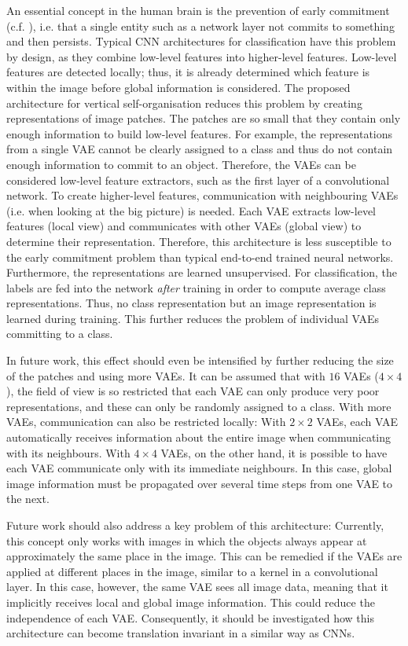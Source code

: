 An essential concept in the human brain is the prevention of early commitment (c.f. ), i.e. that a single entity such as a network layer not commits to something and then persists. Typical CNN architectures for classification have this problem by design, as they combine low-level features into higher-level features. Low-level features are detected locally; thus, it is already determined which feature is within the image before global information is considered. The proposed architecture for vertical self-organisation reduces this problem by creating representations of image patches. The patches are so small that they contain only enough information to build low-level features. For example, the representations from a single VAE cannot be clearly assigned to a class and thus do not contain enough information to commit to an object. Therefore, the VAEs can be considered low-level feature extractors, such as the first layer of a convolutional network. To create higher-level features, communication with neighbouring VAEs (i.e. when looking at the big picture) is needed. Each VAE extracts low-level features (local view) and communicates with other VAEs (global view) to determine their representation. Therefore, this architecture is less susceptible to the early commitment problem than typical end-to-end trained neural networks.
Furthermore, the representations are learned unsupervised. For classification, the labels are fed into the network \emph{after} training in order to compute average class representations. Thus, no class representation but an image representation is learned during training. This further reduces the problem of individual VAEs committing to a class.

In future work, this effect should even be intensified by further reducing the size of the patches and using more VAEs. It can be assumed that with $16$ VAEs ($4\times4$), the field of view is so restricted that each VAE can only produce very poor representations, and these can only be randomly assigned to a class. With more VAEs, communication can also be restricted locally: With $2\times2$ VAEs, each VAE automatically receives information about the entire image when communicating with its neighbours. With $4\times4$ VAEs, on the other hand, it is possible to have each VAE communicate only with its immediate neighbours. In this case, global image information must be propagated over several time steps from one VAE to the next.

Future work should also address a key problem of this architecture: Currently, this concept only works with images in which the objects always appear at approximately the same place in the image. This can be remedied if the VAEs are applied at different places in the image, similar to a kernel in a convolutional layer. In this case, however, the same VAE sees all image data, meaning that it implicitly receives local and global image information. This could reduce the independence of each VAE. Consequently, it should be investigated how this architecture can become translation invariant in a similar way as CNNs.


